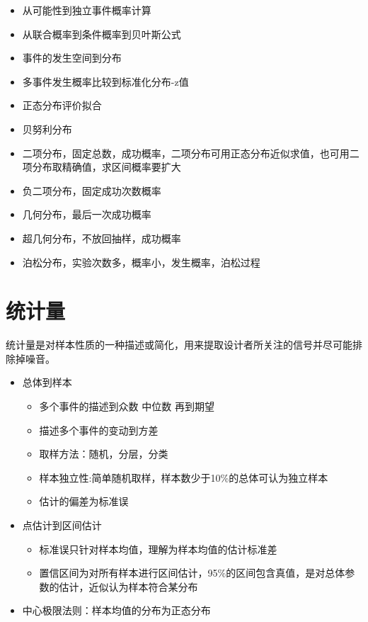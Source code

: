 \documentclass[
]{book}
\providecommand{\tightlist}{%
  \setlength{\itemsep}{0pt}\setlength{\parskip}{0pt}}
\begin{document}
\begin{itemize}
\tightlist
\item
  从可能性到独立事件概率计算
\item
  从联合概率到条件概率到贝叶斯公式
\item
  事件的发生空间到分布
\item
  多事件发生概率比较到标准化分布-z值
\item
  正态分布评价拟合
\item
  贝努利分布
\item
  二项分布，固定总数，成功概率，二项分布可用正态分布近似求值，也可用二项分布取精确值，求区间概率要扩大
\item
  负二项分布，固定成功次数概率
\item
  几何分布，最后一次成功概率
\item
  超几何分布，不放回抽样，成功概率
\item
  泊松分布，实验次数多，概率小，发生概率，泊松过程
\end{itemize}

\hypertarget{ux7edfux8ba1ux91cf}{%
\section{统计量}\label{ux7edfux8ba1ux91cf}}

统计量是对样本性质的一种描述或简化，用来提取设计者所关注的信号并尽可能排除掉噪音。

\begin{itemize}
\item
  总体到样本

  \begin{itemize}
  \tightlist
  \item
    多个事件的描述到众数 中位数 再到期望
  \item
    描述多个事件的变动到方差
  \item
    取样方法：随机，分层，分类
  \item
    样本独立性:简单随机取样，样本数少于10\%的总体可认为独立样本
  \item
    估计的偏差为标准误
  \end{itemize}
\item
  点估计到区间估计

  \begin{itemize}
  \tightlist
  \item
    标准误只针对样本均值，理解为样本均值的估计标准差
  \item
    置信区间为对所有样本进行区间估计，95\%的区间包含真值，是对总体参数的估计，近似认为样本符合某分布
  \end{itemize}
\item
  中心极限法则：样本均值的分布为正态分布
\end{itemize}
\end{document}
